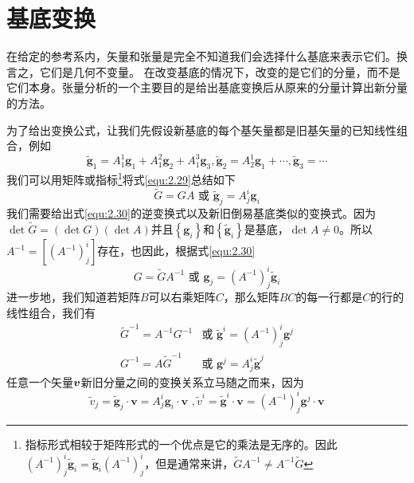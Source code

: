 \section{基底变换}

在给定的参考系内，矢量和张量是完全不知道我们会选择什么基底来表示它们。换言之，它们是几何不变量。 在改变基底的情况下，改变的是它们的分量，而不是它们本身。张量分析的一个主要目的是给出基底变换后从原来的分量计算出新分量的方法。

为了给出变换公式，让我们先假设新基底的每个基矢量都是旧基矢量的已知线性组合，例如
\begin{equation}\label{equ:2.29}
    \tilde{\boldsymbol{g}}_1=A_{1}^{1}\boldsymbol{g}_1+A_{1}^{2}\boldsymbol{g}_2+A_{1}^{3}\boldsymbol{g}_3,\tilde{\boldsymbol{g}}_2=A_{2}^{1}\boldsymbol{g}_1+\cdots ,\tilde{\boldsymbol{g}}_3=\cdots 
\end{equation}
我们可以用矩阵或指标\footnote{指标形式相较于矩阵形式的一个优点是它的乘法是无序的。因此$\left( A^{-1} \right) _{j}^{i}\tilde{\boldsymbol{g}}_i=\tilde{\boldsymbol{g}}_i\left( A^{-1} \right) _{j}^{i}$，但是通常来讲，$\widetilde{G}A^{-1}\ne A^{-1}\widetilde{G}$}将式\eqref{equ:2.29}总结如下
\begin{equation}\label{equ:2.30}
    \widetilde{G}=GA\,\, \text{或} \,\, \tilde{\boldsymbol{g}}_j=A_{j}^{i}\boldsymbol{g}_i
\end{equation}
我们需要给出式\eqref{equ:2.30}的逆变换式以及新旧倒易基底类似的变换式。因为\linebreak$\det \widetilde{G}=\left( \det G \right) \left( \det A \right) $并且$\left\{ \boldsymbol{g}_i \right\} $和$\left\{ \tilde{\boldsymbol{g}}_i \right\} $是基底，$\det A\ne 0$。所以$A^{-1}=\left[ \left( A^{-1} \right) _{j}^{i} \right] $存在，也因此，根据式\eqref{equ:2.30}
\begin{equation}\label{equ:2.31}
    G=\widetilde{G}A^{-1}\,\, \text{或} \,\, \boldsymbol{g}_j=\left( A^{-1} \right) _{j}^{i}\tilde{\boldsymbol{g}}_i
\end{equation}
进一步地，我们知道若矩阵$B$可以右乘矩阵$C$，那么矩阵$BC$的每一行都是$C$的行的线性组合，我们有
\begin{align}
	\widetilde{G}^{-1}=A^{-1}G^{-1}&\text{或} \,\, \tilde{\boldsymbol{g}}^i=\left( A^{-1} \right) _{j}^{i}\boldsymbol{g}^j\label{equ:2.32}\\
	G^{-1}=A\widetilde{G}^{-1}&\text{或} \,\, \boldsymbol{g}^j=A_{j}^{i}\tilde{\boldsymbol{g}}^j\label{equ:2.33}
\end{align}
任意一个矢量$\boldsymbol{v}$新旧分量之间的变换关系立马随之而来，因为
\begin{equation}\label{equ:2.34}
    \tilde{v}_j=\tilde{\boldsymbol{g}}_j\cdot \boldsymbol{v}=A_{j}^{i}\boldsymbol{g}_i\cdot \boldsymbol{v}\,\, ,  \tilde{v}^i=\tilde{\boldsymbol{g}}^i\cdot \boldsymbol{v}=\left( A^{-1} \right) _{j}^{i}\boldsymbol{g}^j\cdot \boldsymbol{v}
\end{equation}
